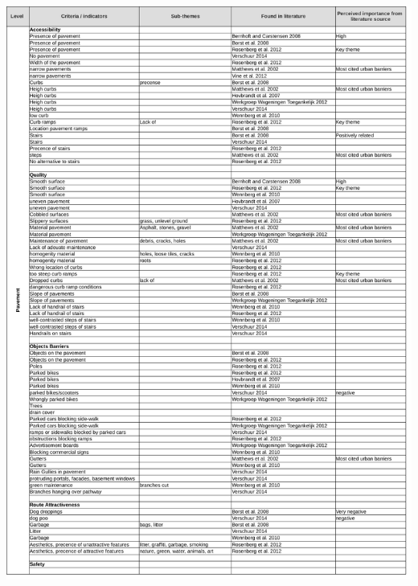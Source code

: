 \begin{appendix}
\includegraphics[width=\textwidth]{img/annex/A2_pavement_criteria.pdf}

\end{appendix}
